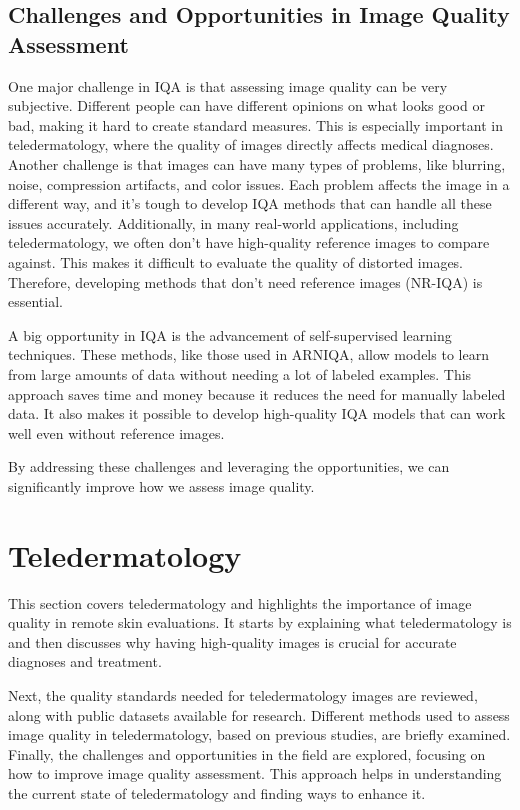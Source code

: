 \subsection{Challenges and Opportunities in Image Quality Assessment} 
\label{sub:ChallengesOpportunitiesIQA} 
One major challenge in IQA is that assessing image quality can be very subjective. Different people can have different opinions on what looks good or bad, making it hard to create standard measures. This is especially important in teledermatology, where the quality of images directly affects medical diagnoses. Another challenge is that images can have many types of problems, like blurring, noise, compression artifacts, and color issues. Each problem affects the image in a different way, and it’s tough to develop IQA methods that can handle all these issues accurately. Additionally, in many real-world applications, including teledermatology, we often don’t have high-quality reference images to compare against. This makes it difficult to evaluate the quality of distorted images. Therefore, developing methods that don’t need reference images (NR-IQA) is essential.\par
\vspace{\baselineskip}
\noindent
A big opportunity in IQA is the advancement of self-supervised learning techniques. These methods, like those used in ARNIQA, allow models to learn from large amounts of data without needing a lot of labeled examples. This approach saves time and money because it reduces the need for manually labeled data. It also makes it possible to develop high-quality IQA models that can work well even without reference images. \par
\vspace{\baselineskip}
\noindent
By addressing these challenges and leveraging the opportunities, we can significantly improve how we assess image quality. \par
\clearpage

\section{Teledermatology}
\label{sec:Teledermatology}
This section covers teledermatology and highlights the importance of image quality in remote skin evaluations. It starts by explaining what teledermatology is and then discusses why having high-quality images is crucial for accurate diagnoses and treatment. \par
\vspace{\baselineskip}
\noindent
Next, the quality standards needed for teledermatology images are reviewed, along with public datasets available for research. Different methods used to assess image quality in teledermatology, based on previous studies, are briefly examined. Finally, the challenges and opportunities in the field are explored, focusing on how to improve image quality assessment. This approach helps in understanding the current state of teledermatology and finding ways to enhance it. \par

